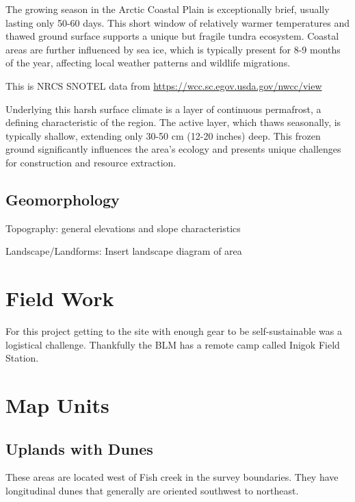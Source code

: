 \documentclass[
]{book}
\theoremstyle{definition}
\theoremstyle{definition}
\theoremstyle{definition}
\theoremstyle{definition}
\theoremstyle{remark}
\begin{document}
The growing season in the Arctic Coastal Plain is exceptionally brief, usually lasting only 50-60 days. This short window of relatively warmer temperatures and thawed ground surface supports a unique but fragile tundra ecosystem. Coastal areas are further influenced by sea ice, which is typically present for 8-9 months of the year, affecting local weather patterns and wildlife migrations.

\label{fig:unnamed-chunk-5}This is NRCS SNOTEL data from \url{https://wcc.sc.egov.usda.gov/nwcc/view}

Underlying this harsh surface climate is a layer of continuous permafrost, a defining characteristic of the region. The active layer, which thaws seasonally, is typically shallow, extending only 30-50 cm (12-20 inches) deep. This frozen ground significantly influences the area's ecology and presents unique challenges for construction and resource extraction.

\hypertarget{geomorphology}{%
\section{Geomorphology}\label{geomorphology}}

Topography: general elevations and slope characteristics

Landscape/Landforms: Insert landscape diagram of area

\hypertarget{field-work}{%
\chapter{Field Work}\label{field-work}}

For this project getting to the site with enough gear to be self-sustainable was a logistical challenge. Thankfully the BLM has a remote camp called Inigok Field Station.

\hypertarget{map-units}{%
\chapter{Map Units}\label{map-units}}

\hypertarget{uplands-with-dunes}{%
\section{Uplands with Dunes}\label{uplands-with-dunes}}

These areas are located west of Fish creek in the survey boundaries. They have longitudinal dunes that generally are oriented southwest to northeast.
\end{document}
